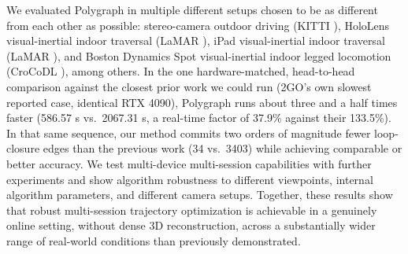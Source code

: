 \noindent
We evaluated Polygraph in multiple different setups chosen to be as different from each other as possible: stereo-camera outdoor driving (KITTI \cite{geiger2012kitti}), HoloLens visual-inertial indoor traversal (LaMAR \cite{sarlin2022lamar}), iPad visual-inertial indoor traversal (LaMAR \cite{sarlin2022lamar}), and Boston Dynamics Spot visual-inertial indoor legged locomotion (CroCoDL \cite{blum2025crocodl}), among others. In the one hardware-matched, head-to-head comparison against the closest prior work we could run (2GO's own slowest reported case, identical RTX 4090), Polygraph runs about three and a half times faster (586.57 s vs.\ 2067.31 s, a real-time factor of 37.9\% against their 133.5\%). In that same sequence, our method commits two orders of magnitude fewer loop-closure edges than the previous work \cite{lim2025twogo} (34 vs.\ 3403) while achieving comparable or better accuracy. We test multi-device multi-session capabilities with further experiments and show algorithm robustness to different viewpoints, internal algorithm parameters, and different camera setups. Together, these results show that robust multi-session trajectory optimization is achievable in a genuinely online setting, without dense 3D reconstruction, across a
substantially wider range of real-world conditions than previously demonstrated.